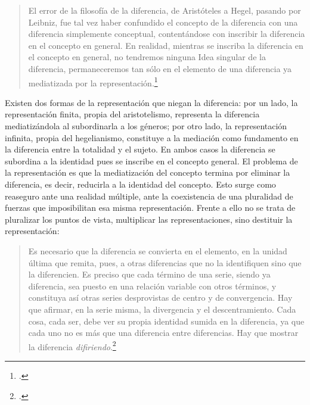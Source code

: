 \begin{quote}
El error de la filosofía de la diferencia, de Aristóteles a Hegel, pasando por Leibniz, fue tal vez haber confundido el concepto de la diferencia con una diferencia simplemente conceptual, contentándose con inscribir la diferencia en el concepto en general. En realidad, mientras se inscriba la diferencia en el concepto en general, no tendremos ninguna Idea singular de la diferencia, permaneceremos tan sólo en el elemento de una diferencia ya mediatizada por la representación.\footcites[58]{@6961-DELEUZE2002}[La noción de \enquote{diferencia interna} resulta central puesto que se permite comprender la distancia con una noción de diferencia externa que no sólo parte de la imposición del concepto exterior, sino de la oposición. En un texto donde rastrea la diferencia en Bergson, Deleuze escribe: \enquote{La filosofía mantiene una relación positiva y directa con las cosas solamente en la medida en que pretende captar la cosa misma de lo que ella es, en su diferencia con respecto a todo lo demás, es decir, en su \emph{diferencia interna}. (\dots) Si existen diferencias de naturaleza entre individuos de un mismo género, habremos de reconocer que, efectivamente, la diferencia no es simplemente espacio-temporal, ni tampoco genérica o específica y, en suma, que no es exterior ni superior a la cosa misma}.][46]{@6975-DELEUZE2005}
\end{quote}

Existen dos formas de la representación que niegan la diferencia: por un lado, la representación finita, propia del aristotelismo, representa la diferencia mediatizándola al subordinarla a los géneros; por otro lado, la representación infinita, propia del hegelianismo, constituye a la mediación como fundamento en la diferencia entre la totalidad y el sujeto. En ambos casos la diferencia se subordina a la identidad pues se inscribe en el concepto general. El problema de la representación es que la mediatización del concepto termina por eliminar la diferencia, es decir, reducirla a la identidad del concepto. Esto surge como reaseguro ante una realidad múltiple, ante la coexistencia de una pluralidad de fuerzas que imposibilitan esa misma representación. Frente a ello no se trata de pluralizar los puntos de vista, multiplicar las representaciones, sino destituir la representación:

\begin{quote}
Es necesario que la diferencia se convierta en el elemento, en la unidad última que remita, pues, a otras diferencias que no la identifiquen sino que la diferencien. Es preciso que cada término de una serie, siendo ya diferencia, sea puesto en una relación variable con otros términos, y constituya así otras series desprovistas de centro y de convergencia. Hay que afirmar, en la serie misma, la divergencia y el descentramiento. Cada cosa, cada ser, debe ver su propia identidad sumida en la diferencia, ya que cada uno no es más que una diferencia entre diferencias. Hay que mostrar la diferencia \emph{difiriendo}.\footcite[101]{@6961-DELEUZE2002}
\end{quote}

